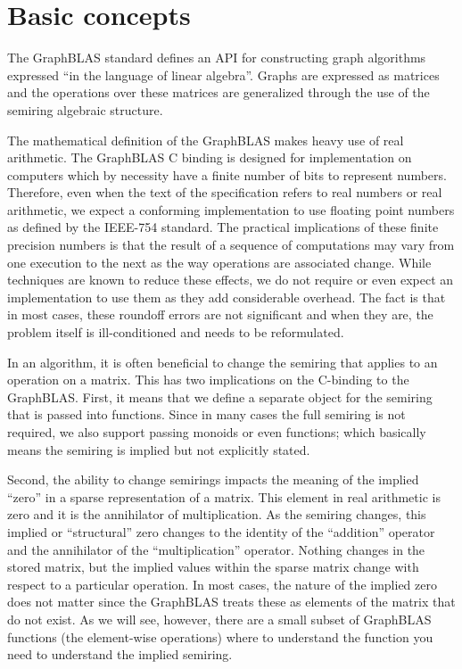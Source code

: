 \chapter{Basic concepts}

The GraphBLAS standard defines an API for constructing
graph algorithms expressed ``in the language of linear algebra''.
Graphs are expressed as matrices and the operations over 
these matrices are generalized through the use of the
semiring algebraic structure.

The mathematical definition of the GraphBLAS makes heavy use
of real arithmetic.   The GraphBLAS C binding is designed for
implementation on computers which by necessity have a finite number
of bits to represent numbers.   Therefore, even when the 
text of the specification refers to real numbers or real arithmetic, we 
expect a conforming implementation to use floating point numbers
as defined by the IEEE-754 standard.  The practical implications
of these finite precision numbers is that the result of a sequence
of computations may vary from one execution to the next as the
way operations are associated change.  While 
techniques are known to reduce these effects, we do not require or
even expect an implementation to use them as they add
considerable overhead.  The fact is that in most cases, these
roundoff errors are not significant and when they are, the problem
itself is ill-conditioned and needs to be reformulated.

In an algorithm, it is often beneficial to change the semiring
that applies to an operation on a matrix.  This has two 
implications on the C-binding to the GraphBLAS.  First,
it means that we define a separate object for the semiring 
that is passed into functions.  Since in many cases the full
semiring is not required, we also support passing monoids or
even functions; which basically means the semiring is implied but not 
explicitly stated.

Second, the ability to change semirings impacts the meaning of 
the implied ``zero'' in a sparse representation of a matrix.
This element in real arithmetic is zero and it is the annihilator of
multiplication.   As the semiring changes, this implied or ``structural''
zero changes to the identity of the ``addition'' operator and the 
annihilator of the ``multiplication'' operator.   Nothing changes in the
stored matrix, but the implied values within the sparse matrix change
with respect to a particular operation.  In most cases, the nature
of the implied zero does not matter since the GraphBLAS treats these
as elements of the matrix that do not exist.  As we will see, however,
there are a small subset of GraphBLAS functions 
(the element-wise operations) where to understand 
the function you need to understand the implied semiring.


